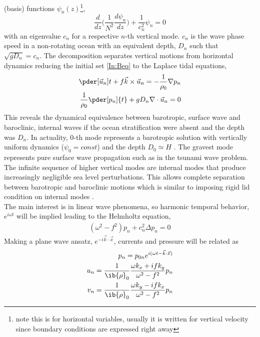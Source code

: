 \documentclass[12pt]{article}
\begin{document}
(basis) functions $\psi_n(z)$\footnote{note this is for horizontal variables, usually it is written 
for vertical velocity since boundary conditions are expressed right away},
\begin{equation}
\frac{d}{dz}\big( \frac{1}{N^2} \frac{d \psi_n}{dz} \big) + \frac{1}{c^2_n}\psi_n = 0
\end{equation}
with an eigenvalue $c_n$ for a respective $n$-th vertical mode. $c_n$ is the wave phase speed in a 
non-rotating ocean with an equivalent depth, $D_n$ such that $\sqrt{g D_n} = c_n$. The 
decomposition separates vertical motions from horizontal dynamics reducing the initial set 
\eqref{In:Beq} to the Laplace tidal equations,
\begin{subequations}
\label{In:sweq}
\begin{align}
\pder[\vec{u}_n]{t} + f \vec{k} \times \vec{u}_n = -\frac{1}{\rho_0} \nabla p_n \label{In:swe.mom}\\
\frac{1}{\rho_0} \pder[p_n]{t} + g D_n \nabla  \cdot \vec{u}_n = 0 \label{In:swe.cont}
\end{align}
\end{subequations}
This reveals the dynamical equivalence between barotropic, surface wave and baroclinic, internal 
waves if the ocean stratification were absent and the depth was $D_n$. In actuality, $0$-th mode 
represents a barotropic solution with vertically uniform dynamics ($\psi_0 = const$) 
and the depth $D_0 \simeq H$ \citep{hendershott1981long}. The gravest mode represents pure surface 
wave propagation such as in the tsunami wave problem. The infinite sequence of higher vertical 
modes are internal modes that produce increasingly negligible sea level perturbations. This allows 
complete separation between barotropic and baroclinic motions which is similar to imposing rigid 
lid condition on internal modes \citep{kundu2008fluid}.\\
The main interest is in linear wave phenomena, so harmonic temporal behavior, $e^{i \omega t}$ 
will be implied leading to the Helmholtz equation,
\begin{align}
\label{In:helmeq}
(\omega^2 - f^2) p_n + c_n^2 \Delta p_n = 0
\end{align}
Making a plane wave ansatz, $e^{-i\vec{k} \cdot \vec{x}}$, currents and pressure will be related as
\begin{align}
\begin{split}
p_n = p_{0n} e^{i (\omega t - \vec{k} \cdot \vec{x})}\\
u_n = \frac{1}{\ib{\rho}_0} \frac{\omega k_x + i f k_y}{\omega^2 - f^2} p_n\\
v_n = \frac{1}{\ib{\rho}_0} \frac{\omega k_y - i f k_x}{\omega^2 - f^2} p_n
\end{split}
\end{align}
\end{document}
